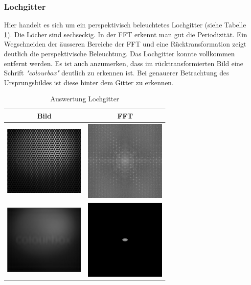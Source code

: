 \documentclass[12pt,german]{article}
\begin{document}
\subsubsection{Lochgitter}
Hier handelt es sich um ein perspektivisch beleuchtetes Lochgitter (siehe Tabelle \ref{tab:AuswertungLochgitter}). Die Löcher sind sechseckig. In der FFT erkennt man gut die Periodizität. Ein Wegschneiden der äusseren Bereiche der FFT und eine Rücktransformation zeigt deutlich die perspektivische Beleuchtung. Das Lochgitter konnte vollkommen entfernt werden. Es ist auch anzumerken, dass im rücktransformierten Bild eine Schrift \textit{"colourbox"} deutlich zu erkennen ist. Bei genauerer Betrachtung des Ursprungsbildes ist diese hinter dem Gitter zu erkennen.  
\begin{table}
  \centering
  \begin{tabular}{c | c}
    \hline
    Bild & FFT \\
    \hline
	\includegraphics[width=4cm]{../testData/Lochgitter.jpg} & \includegraphics[width=4cm]{../testData/Results/Lochgitter/FFT_of_Lochgitter.jpg} \\
    \hline
    \includegraphics[width=4cm]{../testData/Results/Lochgitter/reducedLochgitter.jpg} & \includegraphics[width=4cm]{../testData/Results/Lochgitter/reducedFFT_of_Lochgitter.jpg} \\
  \end{tabular}
  \caption{Auswertung Lochgitter}
  \label{tab:AuswertungLochgitter}
\end{table}
\end{document}
